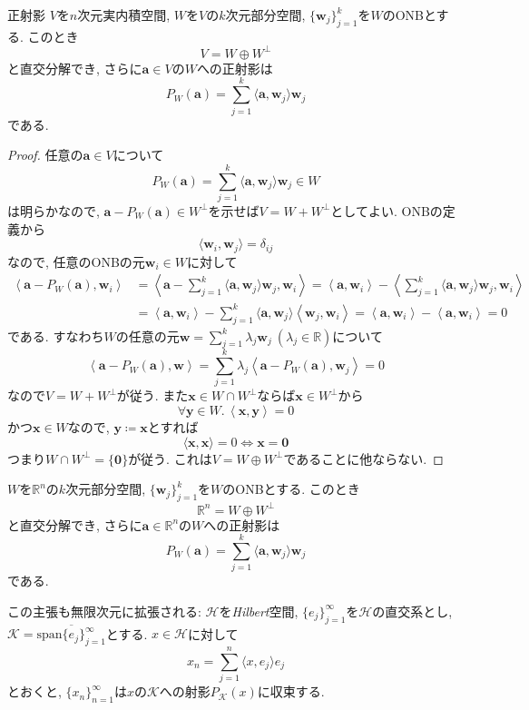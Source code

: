 \documentclass[titlepage]{jsarticle}
\numberwithin{equation}{section}
\newcommand{\R}{\mathbb{R}}%
\begin{document}
\begin{thm}{正射影}{}
$V$を$n$次元実内積空間, $W$を$V$の$k$次元部分空間, $\{\bm{w}_j\}_{j=1}^k$を$W$のONBとする. このとき
\[
V = W \oplus W^\perp
\]
と直交分解でき, さらに$\bm{a}\in V$の$W$への正射影は
\[
P_W(\bm{a}) = \sum_{j=1}^k \langle \bm{a}, \bm{w}_j \rangle\bm{w}_j
\]
である.
\end{thm}
\begin{proof}
任意の$\bm{a}\in V$について
\[
P_W(\bm{a}) = \sum_{j=1}^k \langle \bm{a}, \bm{w}_j \rangle\bm{w}_j \in W
\]
は明らかなので, $\bm{a}-P_W(\bm{a}) \in W^\perp$を示せば$V = W + W^\perp$としてよい. ONBの定義から
\[
\langle \bm{w}_i, \bm{w}_j \rangle = \delta_{ij}
\]
なので, 任意のONBの元$\bm{w}_i\in W$に対して
\begin{align*}
\left\langle \bm{a}-P_W(\bm{a}), \bm{w}_i \right\rangle
&=
\left\langle
\bm{a}-\sum_{j=1}^k \langle \bm{a}, \bm{w}_j \rangle \bm{w}_j,
\bm{w}_i
\right\rangle
=
\left\langle \bm{a}, \bm{w}_i\right\rangle
-
\left\langle
\sum_{j=1}^k \langle \bm{a}, \bm{w}_j\rangle \bm{w}_j,
\bm{w}_i
\right\rangle\\
&=
\left\langle \bm{a}, \bm{w}_i\right\rangle
-
\sum_{j=1}^k
\langle \bm{a}, \bm{w}_j\rangle
\left\langle \bm{w}_j,\bm{w}_i \right\rangle
=
\left\langle \bm{a}, \bm{w}_i\right\rangle
-
\left\langle \bm{a}, \bm{w}_i\right\rangle
=0
\end{align*}
である. すなわち$W$の任意の元$\bm{w} = \sum_{j=1}^k \lambda_j\bm{w}_j\:(\lambda_j \in \R)$について
\[
\left\langle \bm{a}-P_W(\bm{a}), \bm{w} \right\rangle = \sum_{j=1}^k \lambda_j\left\langle \bm{a}-P_W(\bm{a}), \bm{w}_j \right\rangle = 0
\]
なので$V = W + W^\perp$が従う. また$\bm{x}\in W \cap W^\perp$ならば$\bm{x}\in W^\perp$から
\[
\forall \bm{y}\in W.\,\left\langle \bm{x}, \bm{y} \right\rangle = 0
\]
かつ$\bm{x}\in W$なので, $\bm{y}\coloneq \bm{x}$とすれば
\[
\langle \bm{x}, \bm{x} \rangle = 0 \iff \bm{x} = \bm{0}
\]
つまり$W \cap W^\perp = \{\bm{0}\}$が従う. これは$V = W  \oplus W^\perp$であることに他ならない.
\end{proof}

\begin{thm}{}{}
$W$を$\R^n$の$k$次元部分空間, $\{\bm{w}_j\}_{j=1}^k$を$W$のONBとする. このとき
\[
\R^n = W \oplus W^\perp
\]
と直交分解でき, さらに$\bm{a}\in\R^n$の$W$への正射影は
\[
P_W(\bm{a}) = \sum_{j=1}^k \langle \bm{a}, \bm{w}_j \rangle\bm{w}_j
\]
である.
\end{thm}
\begin{marker}
この主張も無限次元に拡張される: $\mathcal{H}$を\textit{Hilbert}空間, $\{e_j\}_{j=1}^\infty$を$\mathcal{H}$の直交系とし, $\mathcal{K} = \overline{\text{span}\{e_j\}_{j=1}^\infty}$とする. $x \in \mathcal{H}$に対して
\[
x_n = \sum_{j=1}^n \langle x, e_j \rangle e_j
\]
とおくと, $\{x_n\}_{n=1}^\infty$は$x$の$\mathcal{K}$への射影$P_\mathcal{K}(x)$に収束する.
\end{marker}
\end{document}
